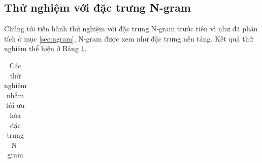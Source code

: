 \subsection*{Thử nghiệm với đặc trưng N-gram}
Chúng tôi tiến hành thử nghiệm với đặc trưng N-gram trước tiên vì như đã phân tích ở mục \ref{sec:ngram}, N-gram được xem như đặc trưng nền tảng. Kết quả thử nghiệm thể hiện ở Bảng \ref{table:ngram}.
\begin{table}[h]
\centering
\begin{minipage}{1.0\textwidth}
\caption{Các thử nghiệm nhằm tối ưu hóa đặc trưng N-gram} \label{table:ngram}
\begin{tabular}{|l| m{} | >{\centering\arraybackslash} m{} | >{\centering\arraybackslash}m{} | >{\centering\arraybackslash}m{} | } 


\end{tabular}
\end{minipage}
\end{table}

